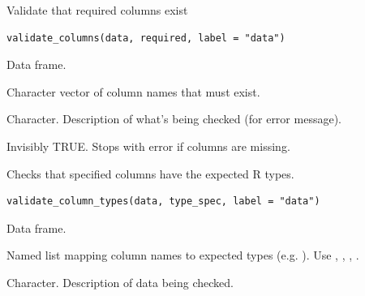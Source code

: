 \documentclass[a4paper]{book}
\begin{document}
%
\begin{Description}
Validate that required columns exist
\end{Description}
%
\begin{Usage}
\begin{verbatim}
validate_columns(data, required, label = "data")
\end{verbatim}
\end{Usage}
%
\begin{Arguments}
\begin{ldescription}
\item[\code{data}] Data frame.

\item[\code{required}] Character vector of column names that must exist.

\item[\code{label}] Character. Description of what's being checked (for error message).
\end{ldescription}
\end{Arguments}
%
\begin{Value}
Invisibly TRUE. Stops with error if columns are missing.
\end{Value}
%
\begin{Description}
Checks that specified columns have the expected R types.
\end{Description}
%
\begin{Usage}
\begin{verbatim}
validate_column_types(data, type_spec, label = "data")
\end{verbatim}
\end{Usage}
%
\begin{Arguments}
\begin{ldescription}
\item[\code{data}] Data frame.

\item[\code{type\_spec}] Named list mapping column names to expected types
(e.g. ).
Use , , , .

\item[\code{label}] Character. Description of data being checked.
\end{ldescription}
\end{Arguments}
\end{document}
